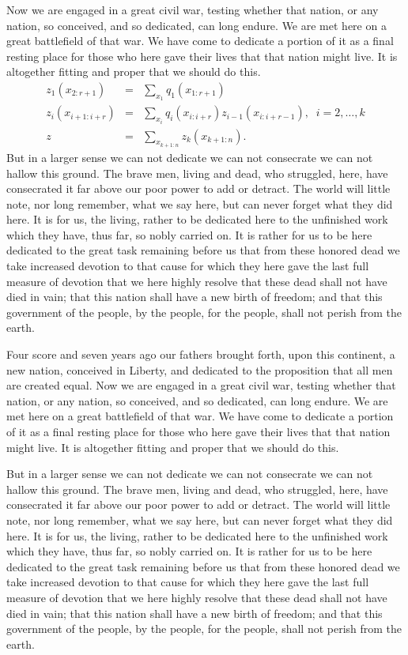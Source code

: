 \documentclass{roffin}
\begin{document}
Now we are engaged in a great civil war, testing whether that nation, or any nation, so conceived, and so dedicated, can long endure.
We are met here on a great battlefield of that war. We have come to dedicate a portion of it as a final resting place for those who
here gave their lives that that nation might live. It is altogether fitting and proper that we should do this.
\begin{eqnarray}
 z_1(x_{2:r+1}) &=& \sum_{x_1} q_1(x_{1:r+1}) \label{eqn:for1} \\
 z_i(x_{i+1:i+r}) &=& \sum_{x_i} q_i(x_{i:i+r})z_{i-1}(x_{i:i+r-1}),
 \;\; i=2,\dots,k \label{eqn:fori} \\
 z &=& \sum_{x_{k+1:n}} z_k(x_{k+1:n}). \label{eqn:for2}
\end{eqnarray}
But in a larger sense we can not dedicate we can not consecrate we can not hallow this ground. The brave men, living and dead,
who struggled, here, have consecrated it far above our poor power to add or detract. The world will little note, nor long remember,
what we say here, but can never forget what they did here. It is for us, the living, rather to be dedicated here to the unfinished work
which they have, thus far, so nobly carried on. It is rather for us to be here dedicated to the great task remaining before us that
from these honored dead we take increased devotion to that cause for which they here gave the last full measure of devotion that
we here highly resolve that these dead shall not have died in vain; that this nation shall have a new birth of freedom; and that this
government of the people, by the people, for the people, shall not perish from the \cite{Ball65} earth.


Four score and seven years ago our fathers brought forth,
upon this continent, a new nation, conceived in Liberty, and dedicated to
the proposition that all men are created equal. Now we are engaged in a great civil war, testing whether that nation, or any nation, so conceived, and so dedicated, can long endure.
We are met here on a great battlefield of that war. We have come to dedicate a portion of it as a final resting place for those who
here gave their lives that that nation might live. It is altogether fitting and proper that we should do this.


But in a larger sense we can not dedicate we can not consecrate we can not hallow this ground. The brave men, living and dead,
who struggled, here, have consecrated it far above our poor power to add or detract. The world will little note, nor long remember,
what we say here, but can never forget what they did here. It is for us, the living, rather to be dedicated here to the unfinished work
which they have, thus far, so nobly carried on. It is rather for us to be here dedicated to the great task remaining before us that
from these honored dead we take increased devotion to that cause for which they here gave the last full measure of devotion that
we here highly resolve that these dead shall not have died in vain; that this nation shall have a new birth of freedom; and that this
government of the people, by the people, for the people, shall not perish from the earth.\vspace*{-5pt}
\end{document}
